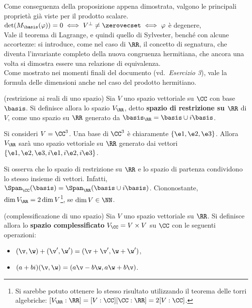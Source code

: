 \documentclass[11pt]{article}
\begin{document}
	\begin{remark}
		Come conseguenza della proposizione appena dimostrata, valgono
		le principali proprietà già viste per il prodotto scalare. \\
		
		\li $\det(M_\basis(\varphi)) = 0 \iff V^\perp \neq \zerovecset \iff \varphi$ è degenere, \\
		\li Vale il teorema di Lagrange, e quindi quello di Sylvester, benché con alcune accortezze: si
		introduce, come nel caso di $\RR$, il concetto di segnatura, che diventa l'invariante completo
		della nuova congruenza hermitiana, che ancora una volta si dimostra essere una relazione
		di equivalenza. \\
		\li Come mostrato nei momenti finali del documento (vd.~\textit{Esercizio 3}), vale
		la formula delle dimensioni anche nel caso del prodotto hermitiano.
	\end{remark}

	\hr

	\begin{definition} (restrizione ai reali di uno spazio) Sia $V$
		uno spazio vettoriale su $\CC$ con base $\basis$. Si definisce allora lo spazio $V_\RR$, detto
		\textbf{spazio di restrizione su $\RR$} di $V$, come uno spazio su $\RR$ generato da
		$\basis_\RR = \basis \cup i \basis$. 
	\end{definition}

	\begin{example}
		Si consideri $V = \CC^3$. Una base di $\CC^3$ è chiaramente $\{ \e1, \e2, \e3 \}$. Allora
		$V_\RR$ sarà uno spazio vettoriale su $\RR$ generato dai vettori $\{ \e1, \e2, \e3, i\e1, i\e2, i\e3 \}$.
	\end{example}

	\begin{remark}
		Si osserva che lo spazio di restrizione su $\RR$ e lo spazio di partenza condividono lo stesso insieme
		di vettori. Infatti, $\Span_\CC(\basis) = \Span_\RR(\basis \cup i\basis)$. Ciononostante, $\dim V_\RR = 2 \dim V$\footnote{Si sarebbe potuto ottenere lo stesso risultato utilizzando il teorema delle torri algebriche: $[V_\RR : \RR] = [V: \CC] [\CC: \RR] = 2 [V : \CC]$.}, se $\dim V \in \NN$.
	\end{remark}

	\begin{definition} (complessificazione di uno spazio) Sia $V$ uno spazio vettoriale su $\RR$.
		Si definisce allora lo \textbf{spazio complessificato} $V_\CC = V \times V$ su $\CC$ con le seguenti operazioni:
		
		\begin{itemize}
			\item $(\v, \w) + (\v', \w') = (\v + \v', \w + \w')$,
			\item $(a+bi)(\v, \w) = (a\v - b\w, a\w + b\v)$.
		\end{itemize}
	\end{definition}
\end{document}
